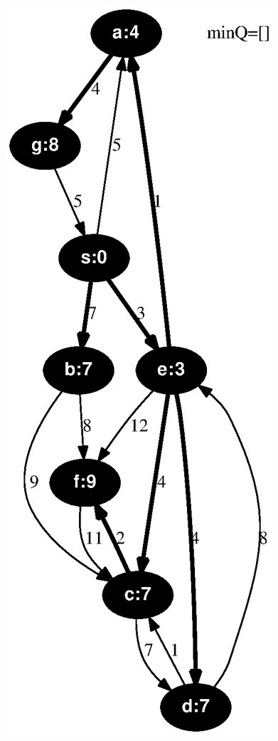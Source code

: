 \documentclass{article}
\begin{document}
\includegraphics[height=.3\textheight]{dijkstra_gross_yellen_08.eps}
\vspace{1em}
\end{document}
